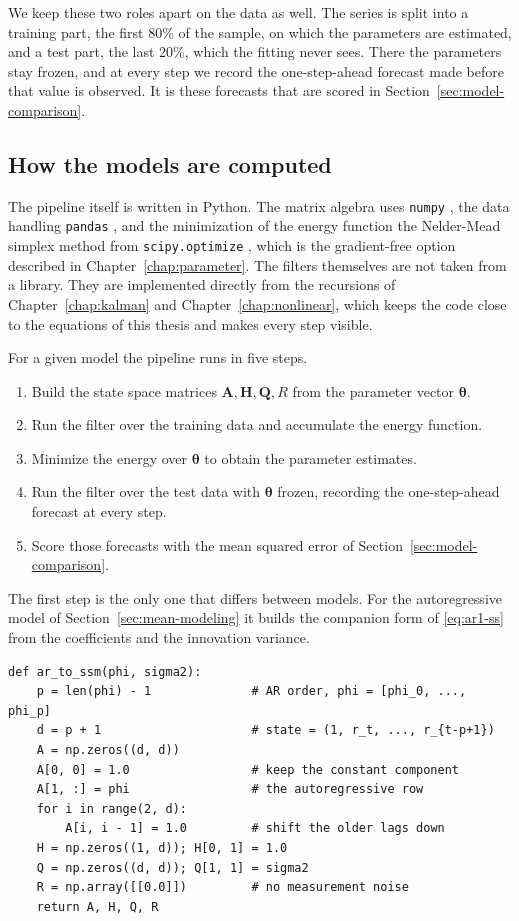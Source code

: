 We keep these two roles apart on the data as well. The series is split into a training part, the first $80\%$ of the sample, on which the parameters are estimated, and a test part, the last $20\%$, which the fitting never sees. There the parameters stay frozen, and at every step we record the one-step-ahead forecast made before that value is observed. It is these forecasts that are scored in Section~\ref{sec:model-comparison}.

\subsection{How the models are computed}
The pipeline itself is written in Python. The matrix algebra uses \texttt{numpy} \cite{numpy}, the data handling \texttt{pandas} \cite{pandas}, and the minimization of the energy function the Nelder-Mead simplex method from \texttt{scipy.optimize} \cite{scipy}, which is the gradient-free option described in Chapter~\ref{chap:parameter}. The filters themselves are not taken from a library. They are implemented directly from the recursions of Chapter~\ref{chap:kalman} and Chapter~\ref{chap:nonlinear}, which keeps the code close to the equations of this thesis and makes every step visible.

For a given model the pipeline runs in five steps.

\begin{enumerate}
  \item Build the state space matrices $\mathbf{A}, \mathbf{H}, \mathbf{Q}, R$ from the parameter vector $\boldsymbol{\theta}$.
  \item Run the filter over the training data and accumulate the energy function.
  \item Minimize the energy over $\boldsymbol{\theta}$ to obtain the parameter estimates.
  \item Run the filter over the test data with $\boldsymbol{\theta}$ frozen, recording the one-step-ahead forecast at every step.
  \item Score those forecasts with the mean squared error of Section~\ref{sec:model-comparison}.
\end{enumerate}

The first step is the only one that differs between models. For the autoregressive model of Section~\ref{sec:mean-modeling} it builds the companion form of \eqref{eq:ar1-ss} from the coefficients and the innovation variance.

\begin{verbatim}
def ar_to_ssm(phi, sigma2):
    p = len(phi) - 1              # AR order, phi = [phi_0, ..., phi_p]
    d = p + 1                     # state = (1, r_t, ..., r_{t-p+1})
    A = np.zeros((d, d))
    A[0, 0] = 1.0                 # keep the constant component
    A[1, :] = phi                 # the autoregressive row
    for i in range(2, d):
        A[i, i - 1] = 1.0         # shift the older lags down
    H = np.zeros((1, d)); H[0, 1] = 1.0
    Q = np.zeros((d, d)); Q[1, 1] = sigma2
    R = np.array([[0.0]])         # no measurement noise
    return A, H, Q, R
\end{verbatim}

